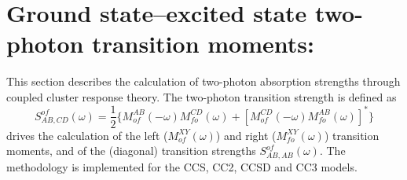 
\section{Ground state--excited state two-photon transition moments:
} \label{sec:cctpa}

This section describes the calculation of 
two-photon absorption strengths 
through coupled cluster response theory.
The two-photon transition strength is defined as
\[
S^{of}_{AB,CD}(\omega) = \frac{1}{2} \{ M^{AB}_{of}(-\omega) M^{CD}_{fo}(\omega)
                         +[M^{CD}_{of}(-\omega) M^{AB}_{fo}(\omega)]^\ast\}
\]
 drives the calculation of the left ($M^{XY}_{of}(\omega)$)
and right ($M^{XY}_{fo}(\omega)$) transition moments, and of the 
(diagonal) transition strengths $S^{of}_{AB,AB}(\omega)$.
The methodology is implemented for the CCS, CC2, CCSD and CC3 models.

\begin{center}
\end{center}

